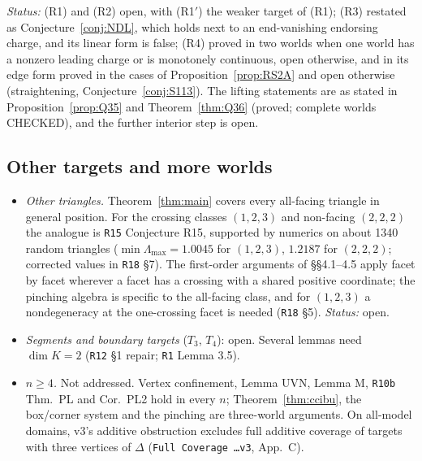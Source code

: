 \documentclass[11pt]{article}
\theoremstyle{definition}
\theoremstyle{remark}
\newcommand{\src}[1]{\texttt{#1}}
\begin{document}
\emph{Status:} (R1) and (R2) open, with (R1$'$) the weaker target of (R1); (R3) restated as Conjecture~\ref{conj:NDL}, which holds next to an end-vanishing endorsing charge, and its linear form is false; (R4) proved in two worlds when one world has a nonzero leading charge or is monotonely continuous, open otherwise, and in its edge form proved in the cases of Proposition~\ref{prop:RS2A} and open otherwise (straightening, Conjecture~\ref{conj:S113}). The lifting statements are as stated in Proposition~\ref{prop:Q35} and Theorem~\ref{thm:Q36} (proved; complete worlds CHECKED), and the further interior step is open.

\subsection{Other targets and more worlds}\label{sec:open-other}
\begin{itemize}[leftmargin=*]
\item \emph{Other triangles.} Theorem~\ref{thm:main} covers every all-facing triangle in general position. For the crossing classes $(1,2,3)$ and non-facing $(2,2,2)$ the analogue is \src{R15} Conjecture R15, supported by numerics on about 1340 random triangles ($\min\Lambda_{\max}=1.0045$ for $(1,2,3)$, $1.2187$ for $(2,2,2)$; corrected values in \src{R18} \S7). The first-order arguments of \S\S4.1--4.5 apply facet by facet wherever a facet has a crossing with a shared positive coordinate; the pinching algebra is specific to the all-facing class, and for $(1,2,3)$ a nondegeneracy at the one-crossing facet is needed (\src{R18} \S5). \emph{Status:} open.
\item \emph{Segments and boundary targets} ($T_3$, $T_4$): open. Several lemmas need $\dim K=2$ (\src{R12} \S1 repair; \src{R1} Lemma 3.5).
\item \emph{$n\ge4$.} Not addressed. Vertex confinement, Lemma UVN, Lemma M, \src{R10b} Thm.~PL and Cor.~PL2 hold in every $n$; Theorem~\ref{thm:ccibu}, the box/corner system and the pinching are three-world arguments. On all-model domains, v3's additive obstruction excludes full additive coverage of targets with three vertices of $\Delta$ (\src{Full Coverage \dots v3}, App.~C).
\end{itemize}
\end{document}

